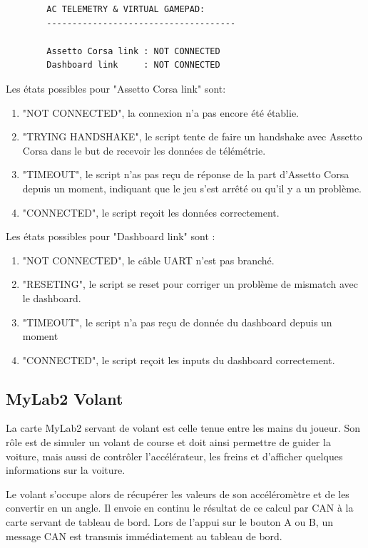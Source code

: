 \documentclass[french, 11pt]{article}
\begin{document}
		\begin{lstlisting}
		AC TELEMETRY & VIRTUAL GAMEPAD:
		-------------------------------------
		
		Assetto Corsa link : NOT CONNECTED                         
		Dashboard link     : NOT CONNECTED   
		\end{lstlisting}
		
				Les états possibles pour "Assetto Corsa link" sont:
		
				\begin{enumerate}
					\item "NOT CONNECTED", la connexion n'a pas encore été établie.
					\item "TRYING HANDSHAKE", le script tente de faire un handshake avec Assetto Corsa dans le but de recevoir les données de télémétrie.
					\item "TIMEOUT", le script n'as pas reçu de réponse de la part d'Assetto Corsa depuis un moment, indiquant que le jeu s'est arrêté ou qu'il y a un problème.
					\item "CONNECTED", le script reçoit les données correctement.
				\end{enumerate}
		
				Les états possibles pour "Dashboard link" sont : 
		
				\begin{enumerate}
					\item "NOT CONNECTED", le câble UART n'est pas branché.
					\item "RESETING", le script se reset pour corriger un problème de mismatch avec le dashboard.
					\item "TIMEOUT", le script n'a pas reçu de donnée du dashboard depuis un moment
					\item "CONNECTED", le script reçoit les inputs du dashboard correctement.
				\end{enumerate}

        \subsection{MyLab2 Volant}

		La carte MyLab2 servant de volant est celle tenue entre les mains du joueur. Son rôle est de simuler un volant de course et doit ainsi permettre de guider la voiture, mais aussi de contrôler l'accélérateur, les freins et d'afficher quelques informations sur la voiture.

        Le volant s'occupe alors de récupérer les valeurs de son accéléromètre et de les convertir en un angle. Il envoie en continu le résultat de ce calcul par CAN à la carte servant de tableau de bord. Lors de l'appui sur le bouton A ou B, un message CAN est transmis immédiatement au tableau de bord. 
		
\end{document}
